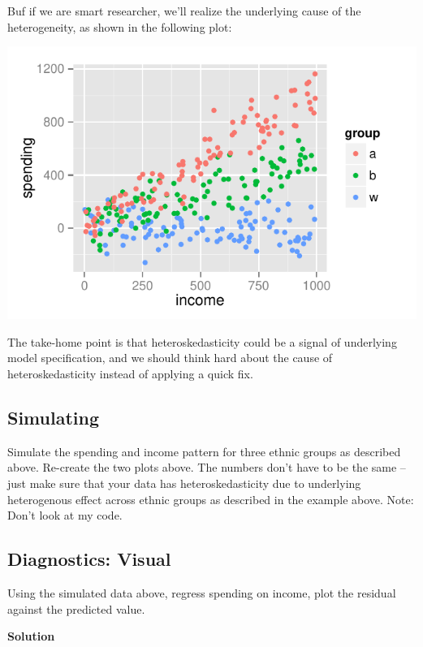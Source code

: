 \documentclass{article}\usepackage[]{graphicx}\usepackage[]{color}
\makeatletter
\def\maxwidth{ %
  \ifdim\Gin@nat@width>\linewidth
    \linewidth
  \else
    \Gin@nat@width
  \fi
}
\newenvironment{knitrout}{}{} %
\makeatother
\begin{document}
Buf if we are smart researcher, we'll realize the underlying cause of the heterogeneity, as shown in the following plot:

\begin{knitrout}
\color{fgcolor}
\includegraphics[width=\maxwidth]{figure/unnamed-chunk-3-1} 

\end{knitrout}

The take-home point is that heteroskedasticity could be a signal of underlying model specification, and we should think hard about the cause of heteroskedasticity instead of applying a quick fix.

\subsection{Simulating}

Simulate the spending and income pattern for three ethnic groups as described above. Re-create the two plots above. The numbers don't have to be the same -- just make sure that your data has heteroskedasticity due to underlying heterogenous effect across ethnic groups as described in the example above. Note: Don't look at my code.

\subsection{Diagnostics: Visual}

Using the simulated data above, regress spending on income, plot the residual against the predicted value.

\textbf{Solution}
\end{document}
